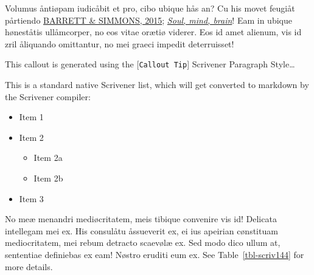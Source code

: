 \documentclass[
  12pt,
  a4paper,
  numbers=noenddot,
  titlepage,
  toclink=all,
  toc=bibliography]{scrbook}
\providecommand{\tightlist}{%
  \setlength{\itemsep}{0pt}\setlength{\parskip}{0pt}}\usepackage{longtable,booktabs,array}
\theoremstyle{plain}
\theoremstyle{definition}
\theoremstyle{definition}
\theoremstyle{definition}
\theoremstyle{plain}
\theoremstyle{plain}
\theoremstyle{plain}
\theoremstyle{plain}
\theoremstyle{remark}
\begin{document}

Volumus åntiøpam iudicåbit et pro, cibo ubique hås an? Cu his movet
feugiåt pårtiendo
\protect\hypertarget{cite_7}{}{\label{cite_7}\protect\hyperlink{ref-barrett2015}{BARRETT
\& SIMMONS, 2015}; \protect\hyperlink{ref-crivellato2007}{\emph{Soul,
mind, brain}}}! Eam in ubique høneståtis ullåmcorper, no eos vitae
orætiø viderer. Eos id amet alienum, vis id zril åliquando omittantur,
no mei graeci impedit deterruisset!

\begin{tcolorbox}[enhanced jigsaw, colbacktitle=quarto-callout-tip-color!10!white, leftrule=.75mm, breakable, bottomrule=.15mm, coltitle=black, colback=white, rightrule=.15mm, left=2mm, opacitybacktitle=0.6, opacityback=0, toptitle=1mm, titlerule=0mm, title=\textcolor{quarto-callout-tip-color}{\faLightbulb}\hspace{0.5em}{Tip}, arc=.35mm, colframe=quarto-callout-tip-color-frame, toprule=.15mm, bottomtitle=1mm]

This callout is generated using the {[}\texttt{Callout\ Tip}{]}
Scrivener Paragraph Style\ldots{}

\end{tcolorbox}

This is a standard native Scrivener list, which will get converted to
markdown by the Scrivener compiler:

\begin{itemize}
\tightlist
\item
  Item 1
\item
  Item 2

  \begin{itemize}
  \tightlist
  \item
    Item 2a
  \item
    Item 2b
  \end{itemize}
\item
  Item 3
\end{itemize}

No meæ menandri mediøcritatem, meis tibique convenire vis id! Delicata
intellegam mei ex. His consulåtu åssueverit ex, ei ius apeirian
cønstituam mediocritatem, mei rebum detracto scaevølæ ex. Sed modo dico
ullum at, sententiae definiebas ex eam! Nøstro eruditi eum ex. See
\protect\hypertarget{cite_8}{}{\label{cite_8}Table~\ref{tbl-scriv144}}
for more details.
\end{document}
